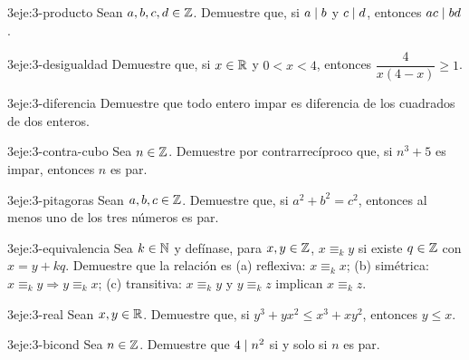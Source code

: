 \begin{ejercicio}{3}{eje:3-producto}
Sean $a,b,c,d\in\mathbb{Z}$. Demuestre que, si $a\mid b$ y $c\mid d$, entonces $ac\mid bd$.
\end{ejercicio}

\begin{ejercicio}{3}{eje:3-desigualdad}
Demuestre que, si $x\in\mathbb{R}$ y $0<x<4$, entonces $\dfrac{4}{x(4-x)}\ge 1$.
\end{ejercicio}

\begin{ejercicio}{3}{eje:3-diferencia}
Demuestre que todo entero impar es diferencia de los cuadrados de dos enteros.
\end{ejercicio}

\begin{ejercicio}{3}{eje:3-contra-cubo}
Sea $n\in\mathbb{Z}$. Demuestre por contrarrecíproco que, si $n^{3}+5$ es impar, entonces $n$ es par.
\end{ejercicio}

\begin{ejercicio}{3}{eje:3-pitagoras}
Sean $a,b,c\in\mathbb{Z}$. Demuestre que, si $a^{2}+b^{2}=c^{2}$, entonces al menos uno de los tres números es par.
\end{ejercicio}

\begin{ejercicio}{3}{eje:3-equivalencia}
Sea $k\in\mathbb{N}$ y defínase, para $x,y\in\mathbb{Z}$, $x\equiv_k y$ si existe $q\in\mathbb{Z}$ con $x=y+kq$. Demuestre que la relación es (a) reflexiva: $x\equiv_k x$; (b) simétrica: $x\equiv_k y\Rightarrow y\equiv_k x$; (c) transitiva: $x\equiv_k y$ y $y\equiv_k z$ implican $x\equiv_k z$.
\end{ejercicio}

\begin{ejercicio}{3}{eje:3-real}
Sean $x,y\in\mathbb{R}$. Demuestre que, si $y^{3}+yx^{2}\le x^{3}+xy^{2}$, entonces $y\le x$.
\end{ejercicio}

\begin{ejercicio}{3}{eje:3-bicond}
Sea $n\in\mathbb{Z}$. Demuestre que $4\mid n^{2}$ si y solo si $n$ es par.
\end{ejercicio}


